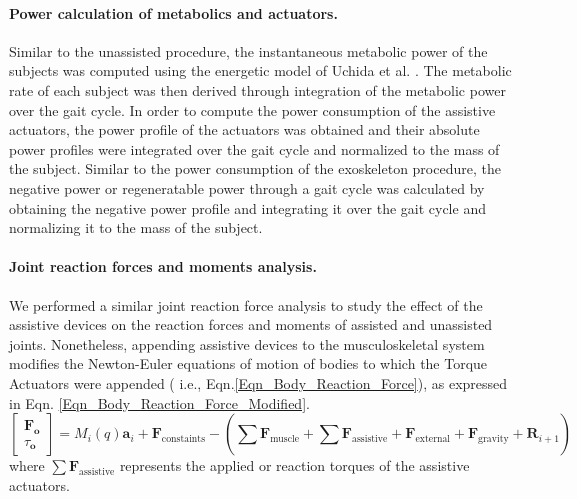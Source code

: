 \documentclass[10pt,letterpaper]{article}
\begin{document}
\paragraph*{Power calculation of metabolics and actuators.} Similar to the unassisted procedure, the instantaneous metabolic power of the subjects was computed using the energetic model of Uchida et al. \cite{106}. The metabolic rate of each subject was then derived through integration of the metabolic power over the gait cycle. In order to compute the power consumption of the assistive actuators, the power profile of the actuators was obtained and their absolute power profiles were integrated over the gait cycle and normalized to the mass of the subject. Similar to the power consumption of the exoskeleton procedure, the negative power or regeneratable power through a gait cycle was calculated by obtaining the negative power profile and integrating it over the gait cycle and normalizing it to the mass of the subject.\\
\paragraph{Joint reaction forces and moments analysis.} We performed a similar joint reaction force analysis to study the effect of the assistive devices on the reaction forces and moments of assisted and unassisted joints. Nonetheless, appending assistive devices to the musculoskeletal system modifies the Newton-Euler equations of motion of bodies to which the Torque Actuators were appended ( i.e., Eqn.\eqref{Eqn_Body_Reaction_Force}), as expressed in Eqn. \eqref{Eqn_Body_Reaction_Force_Modified}.
\begin{equation}\label{Eqn_Body_Reaction_Force_Modified}
\left\lbrack \begin{array}{c}
{\mathit{\mathbf{F}}}_{\mathit{\mathbf{o}}} \\
\tau_{\mathit{\mathbf{o}}} 
\end{array}\right\rbrack =M_i \left(q\right){\mathit{\mathbf{a}}}_i +{\mathit{\mathbf{F}}}_{\mathrm{c}\mathrm{o}\mathrm{n}\mathrm{s}\mathrm{t}\mathrm{a}\mathrm{i}\mathrm{n}\mathrm{t}\mathrm{s}} -\left(\sum_{\;}^{\;} {\mathit{\mathbf{F}}}_{\mathrm{m}\mathrm{u}\mathrm{s}\mathrm{c}\mathrm{l}\mathrm{e}} +\sum{\mathit{\mathbf{F}}}_{\mathrm{assistive}} +{\mathit{\mathbf{F}}}_{\mathrm{e}\mathrm{x}\mathrm{t}\mathrm{e}\mathrm{r}\mathrm{n}\mathrm{a}\mathrm{l}} +{\mathit{\mathbf{F}}}_{\mathrm{g}\mathrm{r}\mathrm{a}\mathrm{v}\mathrm{i}\mathrm{t}\mathrm{y}} +{\mathit{\mathbf{R}}}_{i+1} \right)
\end{equation}
where $\sum{\mathit{\mathbf{F}}}_{\mathrm{assistive}}$ represents the applied or reaction torques of the assistive actuators.
\end{document}
